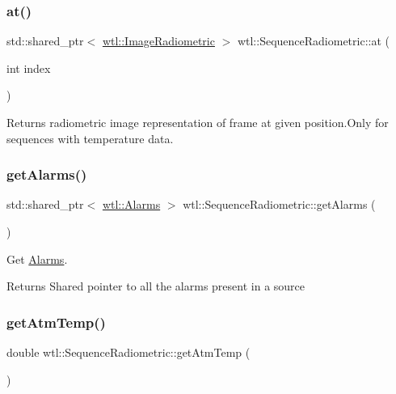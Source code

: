 \subsubsection{\texorpdfstring{at()}{at()}}
{\footnotesize\ttfamily std\+::shared\+\_\+ptr$<$ \hyperlink{classwtl_1_1_image_radiometric}{wtl\+::\+Image\+Radiometric} $>$ wtl\+::\+Sequence\+Radiometric\+::at (\begin{DoxyParamCaption}\item[{int}]{index }\end{DoxyParamCaption})}



Returns radiometric image representation of frame at given position.\+Only for sequences with temperature data. 

\mbox{\label{classwtl_1_1_sequence_radiometric_a11b13d272a8674a3cdccfeb2ed3400fe}} 
\subsubsection{\texorpdfstring{get\+Alarms()}{getAlarms()}}
{\footnotesize\ttfamily std\+::shared\+\_\+ptr$<$ \hyperlink{classwtl_1_1_alarms}{wtl\+::\+Alarms} $>$ wtl\+::\+Sequence\+Radiometric\+::get\+Alarms (\begin{DoxyParamCaption}{ }\end{DoxyParamCaption})}



Get \hyperlink{classwtl_1_1_alarms}{Alarms}. 

\begin{DoxyReturn}{Returns}
Shared pointer to all the alarms present in a source 
\end{DoxyReturn}
\mbox{\label{classwtl_1_1_sequence_radiometric_adb55fc5e945d0a7972b0b2ffda3e8c36}} 
\subsubsection{\texorpdfstring{get\+Atm\+Temp()}{getAtmTemp()}}
{\footnotesize\ttfamily double wtl\+::\+Sequence\+Radiometric\+::get\+Atm\+Temp (\begin{DoxyParamCaption}{ }\end{DoxyParamCaption})}



